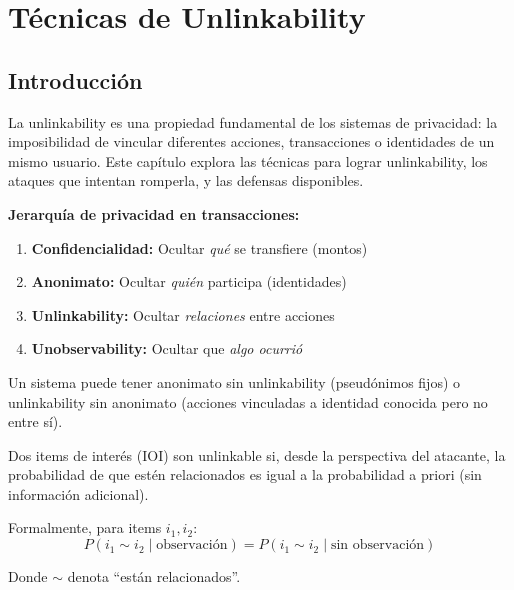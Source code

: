 \documentclass[11pt,a4paper,twoside]{book}
\begin{document}


\chapter{T\'ecnicas de Unlinkability}
\label{ch:unlinkability}

\section*{Introducci\'on}

La unlinkability es una propiedad fundamental de los sistemas de privacidad: la imposibilidad de vincular diferentes acciones, transacciones o identidades de un mismo usuario. Este cap\'itulo explora las t\'ecnicas para lograr unlinkability, los ataques que intentan romperla, y las defensas disponibles.

\begin{keyidea}
\textbf{Jerarqu\'ia de privacidad en transacciones:}

\begin{enumerate}
    \item \textbf{Confidencialidad:} Ocultar \textit{qu\'e} se transfiere (montos)
    \item \textbf{Anonimato:} Ocultar \textit{qui\'en} participa (identidades)
    \item \textbf{Unlinkability:} Ocultar \textit{relaciones} entre acciones
    \item \textbf{Unobservability:} Ocultar que \textit{algo ocurri\'o}
\end{enumerate}

Un sistema puede tener anonimato sin unlinkability (pseud\'onimos fijos) o unlinkability sin anonimato (acciones vinculadas a identidad conocida pero no entre s\'i).
\end{keyidea}

\begin{definition}
Dos items de inter\'es (IOI) son unlinkable si, desde la perspectiva del atacante, la probabilidad de que est\'en relacionados es igual a la probabilidad a priori (sin informaci\'on adicional).

Formalmente, para items $i_1, i_2$:
\[
P(i_1 \sim i_2 \mid \text{observaci\'on}) = P(i_1 \sim i_2 \mid \text{sin observaci\'on})
\]

Donde $\sim$ denota ``est\'an relacionados''.
\end{definition}
\end{document}
